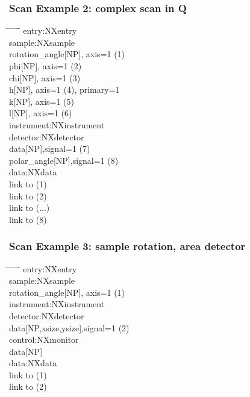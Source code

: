 \documentclass{beamer}
\begin{document}
\begin{frame}
\frametitle{Scan Example 2: complex scan in Q}

\begin{tabbing}
\hspace*{1cm} \= \hspace*{1cm} \= \hspace*{1cm} \= \hspace*{1cm} \= \hspace*{1cm} \= \hspace*{1cm}\= \kill
entry:NXentry \\
 \>sample:NXsample\\
 \> \> rotation\_angle[NP], axis=1 (1) \\
 \> \> phi[NP], axis=1 (2) \\
 \> \> chi[NP], axis=1 (3) \\
 \> \> h[NP], axis=1 (4), primary=1 \\
 \> \> k[NP], axis=1 (5) \\
 \> \> l[NP], axis=1 (6) \\
 \> instrument:NXinstrument\\
 \>  \>detector:NXdetector\\
 \>  \> \>data[NP],signal=1 (7)\\
 \>  \> \>polar\_angle[NP],signal=1 (8)\\
 \>data:NXdata\\
 \> \> link to (1)\\
 \> \> link to (2) \\
 \> \> link to (...) \\
 \> \> link to (8) \\
\end{tabbing}
\end{frame}


\begin{frame}
\frametitle{Scan Example 3: sample rotation, area detector}
\begin{tabbing}
\hspace*{1cm} \= \hspace*{1cm} \= \hspace*{1cm} \= \hspace*{1cm} \= \hspace*{1cm} \= \hspace*{1cm}\= \kill
entry:NXentry \\
 \>sample:NXsample\\
 \> \> rotation\_angle[NP], axis=1 (1) \\
 \> instrument:NXinstrument\\
 \>  \>detector:NXdetector\\
 \>  \> \>data[NP,xsize,ysize],signal=1 (2)\\
 \>control:NXmonitor\\  
 \> \>data[NP]\\  
 \>data:NXdata\\
 \> \> link to (1)\\
 \> \> link to (2) \\
\end{tabbing}
\end{frame}
\end{document}
